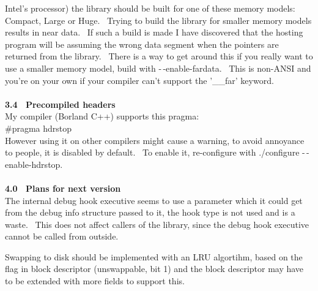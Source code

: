 \documentclass{article}
\begin{document}
Intel's
processor) the library should be built for one of these memory models:
Compact, Large or Huge.~ Trying to build the library for smaller
memory
models results in near data.~ If such a build is made I have
discovered
that the hosting program will be assuming the wrong data segment when
the
pointers are returned from the library.~ There is a way to get
around
this if you really want to use a smaller memory model, build with
-$\,$-enable-fardata.~ This is non-ANSI and you're on your own if your
compiler can't support the '\_\_far' keyword.\\
\\
\textbf{3.4~ Precompiled headers}
\\
My compiler (Borland C++) supports this pragma:
\\
\#pragma hdrstop
\\
However using it on other compilers might cause a warning, to avoid
annoyance to people, it is disabled by default.~ To enable it,
re-configure with ./configure -$\,$-enable-hdrstop.\\
\\
\textbf{4.0~ Plans for next version}
\\
The internal debug hook executive seems to use a parameter which it
could get from the debug info structure passed to it, the hook type is
not used and is a waste.~ This does not affect callers of the
library,
since the debug hook executive cannot be called from outside.
\par Swapping to disk should be implemented with an LRU algortihm, based
on the flag in block descriptor (unswappable, bit 1) and the block
descriptor
may have to be extended with more fields to support this.
\end{document}
